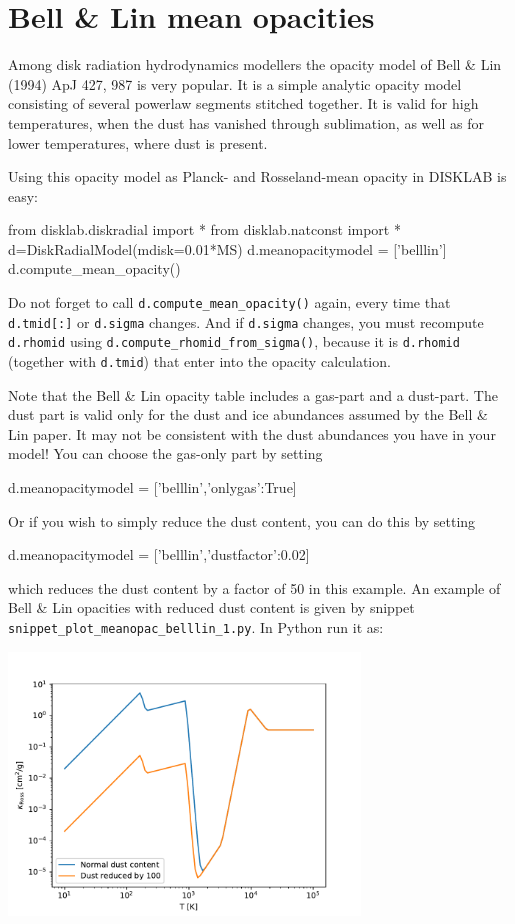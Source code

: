 \documentclass{book}
\newcommand{\code}[1]{{\small\tt #1}}
\begin{document}
\section{Bell \& Lin mean opacities}
\label{sec-mean-opac-bellin}
%
Among disk radiation hydrodynamics modellers the opacity model of Bell \& Lin
(1994) ApJ 427, 987 is very popular. It is a simple analytic opacity model
consisting of several powerlaw segments stitched together.  It is valid for high
temperatures, when the dust has vanished through sublimation, as well as for
lower temperatures, where dust is present.

Using this opacity model as Planck- and Rosseland-mean opacity in {\sf
  DISKLAB} is easy:
\begin{codebox}
from disklab.diskradial import *
from disklab.natconst import *
d=DiskRadialModel(mdisk=0.01*MS)
d.meanopacitymodel = ['belllin']
d.compute_mean_opacity()
\end{codebox}
Do not forget to call \code{d.compute\_mean\_opacity()} again, every
time that \code{d.tmid[:]} or \code{d.sigma} changes. And if
\code{d.sigma} changes, you must recompute \code{d.rhomid} using
\code{d.compute\_rhomid\_from\_sigma()}, because it is \code{d.rhomid}
(together with \code{d.tmid}) that enter into the opacity calculation.

Note that the Bell \& Lin opacity table includes a gas-part and a dust-part.
The dust part is valid only for the dust and ice abundances assumed by
the Bell \& Lin paper. It may not be consistent with the dust abundances
you have in your model! You can choose the gas-only part by setting
\begin{codebox}
d.meanopacitymodel = ['belllin',{'onlygas':True}]
\end{codebox}
Or if you wish to simply reduce the dust content, you can do this
by setting
\begin{codebox}
d.meanopacitymodel = ['belllin',{'dustfactor':0.02}]
\end{codebox}
which reduces the dust content by a factor of 50 in this example.
An example of Bell \& Lin opacities with reduced dust content is
given by snippet
\code{snippet\_plot\_meanopac\_belllin\_1.py}. In Python run it as:
\begin{codebox}
\end{codebox}
\centerline{\includegraphics[width=0.7\textwidth]{../snippets/fig_snippet_plot_meanopac_belllin_1_1.pdf}}
\end{document}
